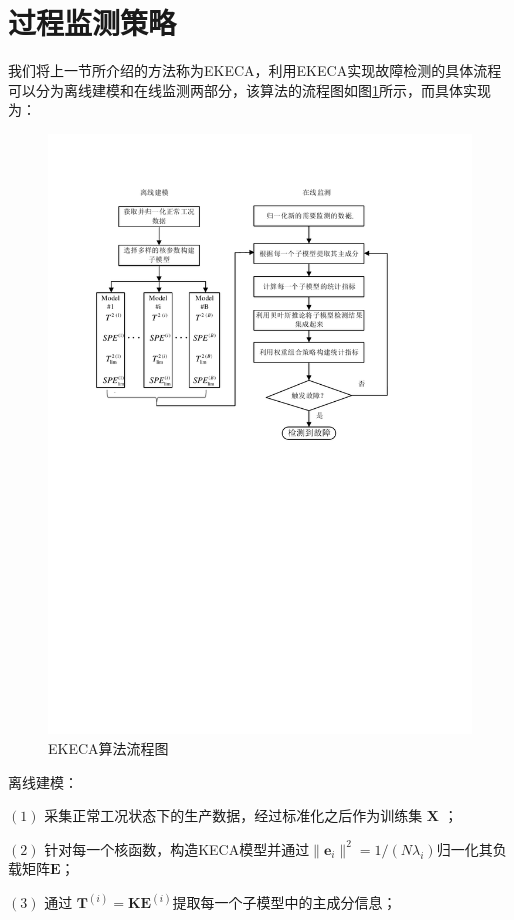 \section{过程监测策略}
我们将上一节所介绍的方法称为EKECA，利用EKECA实现故障检测的具体流程可以分为离线建模和在线监测两部分，该算法的流程图如图\ref{flowchart}所示，而具体实现为：
\begin{figure}[htb]
\centering
\includegraphics{./Pictures/flowchart.pdf}
\caption{EKECA算法流程图}
\label{flowchart}
\end{figure}

离线建模：

$(1)$ 采集正常工况状态下的生产数据，经过标准化之后作为训练集 $\textbf{X}$ ；

$(2)$ 针对每一个核函数，构造KECA模型并通过$\|\textbf{e}_i\|^2=1/(N\lambda_i)$归一化其负载矩阵$\textbf{E}$；

$(3)$ 通过 $\textbf{T}^{(i)}=\textbf{K}\textbf{E}^{(i)}$提取每一个子模型中的主成分信息；

